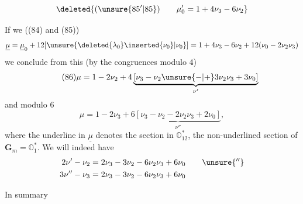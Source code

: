 \[
\deleted{(\unsure{85'|85})\qquad\mu'_0=1+4\nu_3-6\nu_2}
\]



If we  ((84) and (85))
\[
\underline{\mu}=\underline{\mu}_0+12[\unsure{\deleted{\lambda_0}\inserted{\nu_0}|\nu_0}]
=1+4\nu_3-6\nu_2+12(\nu_0-2\nu_2\nu_3)
\]
we conclude from this (by  the congruences modulo $4$)
\[
\tag{86}
\mu=1-2\nu_2+4\underbrace{[\nu_3-\nu_2\unsure{-|+}3\nu_2\nu_3+3\nu_0]}_{\nu'}
\]
and   modulo $6$
\[
\tag{87}
\mu=1-2\nu_3+6\underbrace{[\nu_3-\nu_2-2\nu_2\nu_3+2\nu_0]}_{\nu''},
\]
where the underline in $\underline{\mu}$ denotes the section in $\mathbb O_{12}^*$, the non-underlined \inserted{$\mu$}    section of $\mathbf G_m=\mathbb O_1^*$. We will indeed have
\[
\begin{aligned}
2\nu'-\nu_2&=2\nu_3-3\nu_2-6\nu_2\nu_3+6\nu_0\qquad\unsure{''}\\
3\nu''-\nu_3&=2\nu_3-3\nu_2-6\nu_2\nu_3+6\nu_0
\end{aligned}
\]

In summary

